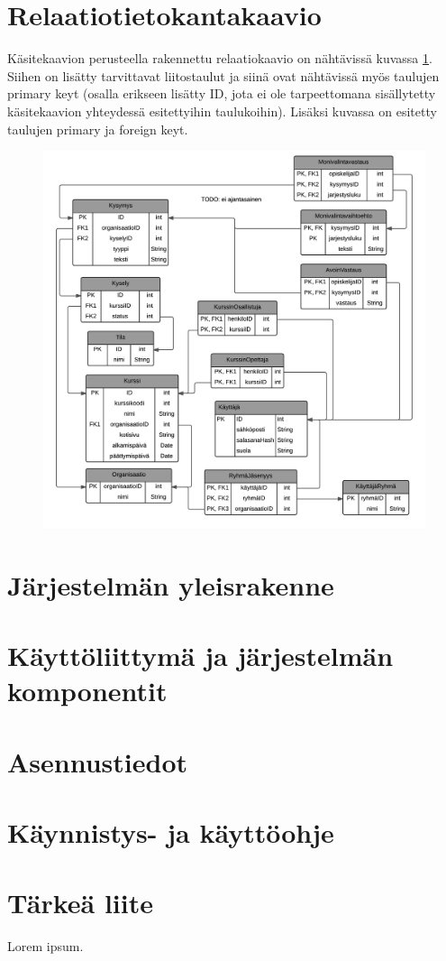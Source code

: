 \documentclass[12pt,a4paper,titlepage]{article}
\begin{document}
\section{Relaatiotietokantakaavio}
Käsitekaavion perusteella rakennettu relaatiokaavio on nähtävissä kuvassa \ref{fig:krelaatiokaavio}. Siihen on lisätty tarvittavat liitostaulut ja siinä ovat nähtävissä myös taulujen primary keyt (osalla erikseen lisätty ID, jota ei ole tarpeettomana sisällytetty käsitekaavion yhteydessä esitettyihin taulukoihin). Lisäksi kuvassa on esitetty taulujen primary ja foreign keyt.

\begin{figure}
   \centering
   \includegraphics[width=\textwidth]{kuvat/relaatiokaavio-pysty.png}
   \caption{}\label{fig:krelaatiokaavio}
\end{figure}

\section{Järjestelmän yleisrakenne}

\section{Käyttöliittymä ja järjestelmän komponentit}

\section{Asennustiedot}

\section{Käynnistys- ja käyttöohje}




\small


\appendix
\section{Tärkeä liite}
Lorem ipsum.
\newpage
\end{document}
